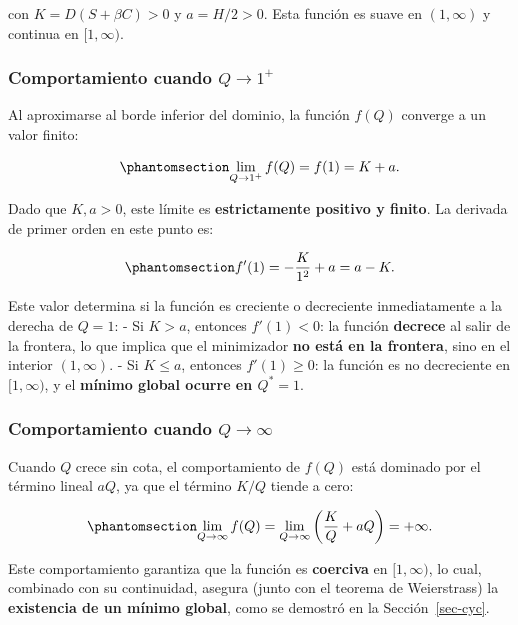 \documentclass[
  spanish,
  us-letterpaper,
]{scrreprt}
\numberwithin{equation}{section}
\begin{document}
con \(K = D(S + \beta C) > 0\) y \(a = H/2 > 0\). Esta función es suave
en \((1, \infty)\) y continua en \([1, \infty)\).

\subsubsection{\texorpdfstring{Comportamiento cuando
\(Q \to 1^+\)}{Comportamiento cuando Q \textbackslash to 1\^{}+}}\label{comportamiento-cuando-q-to-1}

Al aproximarse al borde inferior del dominio, la función \(f(Q)\)
converge a un valor finito:

\begin{equation}\phantomsection\label{eq-lim_Q1}{
\lim_{Q \to 1^+} f(Q) = f(1) = K + a.
}\end{equation}

Dado que \(K, a > 0\), este límite es \textbf{estrictamente positivo y
finito}. La derivada de primer orden en este punto es:

\begin{equation}\phantomsection\label{eq-fp_Q1}{
f'(1) = -\frac{K}{1^2} + a = a - K.
}\end{equation}

Este valor determina si la función es creciente o decreciente
inmediatamente a la derecha de \(Q = 1\): - Si \(K > a\), entonces
\(f'(1) < 0\): la función \textbf{decrece} al salir de la frontera, lo
que implica que el minimizador \textbf{no está en la frontera}, sino en
el interior \((1, \infty)\). - Si \(K \leq a\), entonces
\(f'(1) \geq 0\): la función es no decreciente en \([1, \infty)\), y el
\textbf{mínimo global ocurre en \(Q^* = 1\)}.

\subsubsection{\texorpdfstring{Comportamiento cuando
\(Q \to \infty\)}{Comportamiento cuando Q \textbackslash to \textbackslash infty}}\label{comportamiento-cuando-q-to-infty}

Cuando \(Q\) crece sin cota, el comportamiento de \(f(Q)\) está dominado
por el término lineal \(a Q\), ya que el término \(K/Q\) tiende a cero:

\begin{equation}\phantomsection\label{eq-lim_Qinf}{
\lim_{Q \to \infty} f(Q) = \lim_{Q \to \infty} \left( \frac{K}{Q} + a Q \right) = +\infty.
}\end{equation}

Este comportamiento garantiza que la función es \textbf{coerciva} en
\([1, \infty)\), lo cual, combinado con su continuidad, asegura (junto
con el teorema de Weierstrass) la \textbf{existencia de un mínimo
global}, como se demostró en la Sección~\ref{sec-cyc}.
\end{document}
